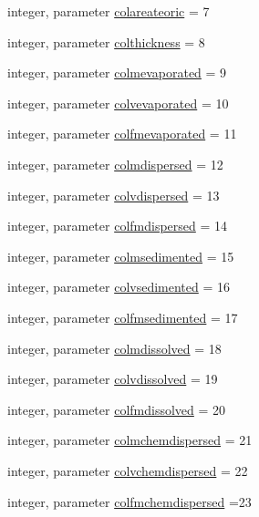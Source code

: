 \begin{DoxyCompactItemize}
integer, parameter \mbox{\hyperlink{namespacemoduleoil_af89963f975b5fe3b77b9127ab82f09bd}{colareateoric}} = 7
\item 
integer, parameter \mbox{\hyperlink{namespacemoduleoil_a8b3c2c19e4304e2265d2bf593bad3caf}{colthickness}} = 8
\item 
integer, parameter \mbox{\hyperlink{namespacemoduleoil_adaaeb4924cb8175bf48760820f0f86ab}{colmevaporated}} = 9
\item 
integer, parameter \mbox{\hyperlink{namespacemoduleoil_aa3ee857b2609932bc79ecde6ce062a04}{colvevaporated}} = 10
\item 
integer, parameter \mbox{\hyperlink{namespacemoduleoil_ae96f8585b6e356dddde5770967401e27}{colfmevaporated}} = 11
\item 
integer, parameter \mbox{\hyperlink{namespacemoduleoil_a351b4b4c542f44239dc1769aabc19e82}{colmdispersed}} = 12
\item 
integer, parameter \mbox{\hyperlink{namespacemoduleoil_afc39ec2f9ea25dbc832655e39fdad7b3}{colvdispersed}} = 13
\item 
integer, parameter \mbox{\hyperlink{namespacemoduleoil_aa43dd6c5feda3ffd11eaf45da4be53b4}{colfmdispersed}} = 14
\item 
integer, parameter \mbox{\hyperlink{namespacemoduleoil_ab28c522cdb0ba8e9677c8bc1b4fcf6a0}{colmsedimented}} = 15
\item 
integer, parameter \mbox{\hyperlink{namespacemoduleoil_ad0b64aaf8de58d27bdb5ab1c3dc70e2a}{colvsedimented}} = 16
\item 
integer, parameter \mbox{\hyperlink{namespacemoduleoil_ab425dda8c296468b2905a264162f96e9}{colfmsedimented}} = 17
\item 
integer, parameter \mbox{\hyperlink{namespacemoduleoil_a59d6f41aca9855d6a7327efac8f3f4a8}{colmdissolved}} = 18
\item 
integer, parameter \mbox{\hyperlink{namespacemoduleoil_a9ffaf173e8c95b21bad287b5861ef859}{colvdissolved}} = 19
\item 
integer, parameter \mbox{\hyperlink{namespacemoduleoil_aca711e07505004093d7f821a746a5e0e}{colfmdissolved}} = 20
\item 
integer, parameter \mbox{\hyperlink{namespacemoduleoil_a4a4c0c64d30f57fba354d9e4cc938720}{colmchemdispersed}} = 21
\item 
integer, parameter \mbox{\hyperlink{namespacemoduleoil_a8e8fb4b278c65dccdc8d9f1800b6bd2d}{colvchemdispersed}} = 22
\item 
integer, parameter \mbox{\hyperlink{namespacemoduleoil_a9bb0cdf66e197c1f1085b7005475fa28}{colfmchemdispersed}} =23

\end{DoxyCompactItemize}
